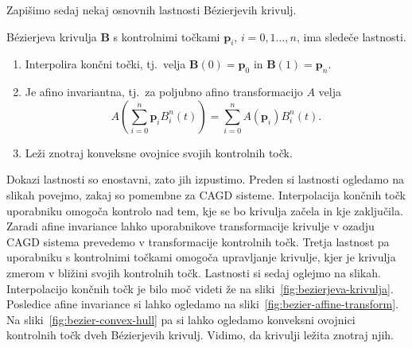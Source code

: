 \documentclass[isrm2, tisk]{fmfdelo}
\newcommand{\p}{\mathbf{p}}
\newcommand{\lilb}[2]{B_{#1}^{#2}(t)}
\newcommand{\bernsteinsump}[2]{\sum_{#1=0}^{#2} \p_{#1}\lilb{#1}{#2}}
\newcommand{\bernsteinsumtritri}[3]{\sum_{#1=0}^{#2} #3\lilb{#1}{#2}}
\begin{document}
    Zapišimo sedaj nekaj osnovnih lastnosti Bézierjevih krivulj.
    \begin{izrek}{Bézierjeva krivulja $\mathbf{B}$ s kontrolnimi točkami $\p_i$, $i=0,1\ldots,n$, ima sledeče lastnosti.}
        \label{izrek:lastnosti-bezierjevih-krivulj}
        \begin{enumerate}
            \item Interpolira končni točki, tj.\ velja $\mathbf{B}(0)=\p_0$ in $\mathbf{B}(1)=\p_n$.
            \item Je afino invariantna, tj.\ za poljubno afino transformacijo $A$ velja \[A \left(\bernsteinsump{i}{n}\right) =\bernsteinsumtritri{i}{n}{A(\p_i)}.\]
            \item Leži znotraj konveksne ovojnice svojih kontrolnih točk.
        \end{enumerate}
    \end{izrek}
    \noindent Dokazi lastnosti so enostavni, zato jih izpustimo.
    Preden si lastnosti ogledamo na slikah povejmo, zakaj so pomembne za CAGD sisteme.
    Interpolacija končnih točk uporabniku omogoča kontrolo nad tem, kje se bo krivulja začela in kje zaključila.
    Zaradi afine invariance lahko uporabnikove transformacije krivulje v ozadju CAGD sistema prevedemo v transformacije kontrolnih točk.
    Tretja lastnost pa uporabniku s kontrolnimi točkami omogoča upravljanje krivulje, kjer je krivulja zmerom v bližini svojih kontrolnih točk.
    Lastnosti si sedaj oglejmo na slikah.
    Interpolacijo končnih točk je bilo moč videti že na sliki~\ref{fig:bezierjeva-krivulja}.
    Posledice afine invariance si lahko ogledamo na sliki~\ref{fig:bezier-affine-transform}.
    Na sliki~\ref{fig:bezier-convex-hull} pa si lahko ogledamo konveksni ovojnici kontrolnih točk dveh Bézierjevih krivulj.
    Vidimo, da krivulji ležita znotraj njih.
\end{document}
